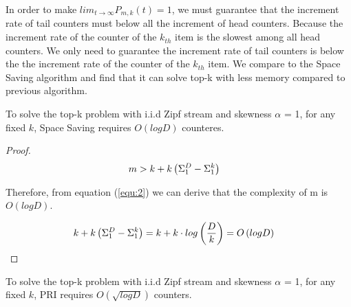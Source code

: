 {%
In order to make $lim_{t\to\infty} P_{m, k}(t) = 1$, we must guarantee that the increment rate of tail counters must below all the increment of head counters. Because the increment rate of the counter of the $k_{th}$ item is the slowest among all head counters. We only need to guarantee the increment rate of tail counters is below the the increment rate of the counter of the $k_{th}$ item.
We compare to the Space Saving algorithm and find that it can solve top-k with less memory compared to previous algorithm. 


\begin{theorem}
	To solve the top-k problem with i.i.d Zipf stream and skewness $\alpha$ = 1, for any fixed $k$, Space Saving requires $O(logD)$ counteres.
\end{theorem}

\begin{proof}
\begin{equation}
\begin{aligned}
\centering  
m &> k + k\left(\Sigma_1^D-\Sigma_1^k\right)
\end{aligned}
\end{equation}

Therefore, from equation (\ref{equ:2}) we can derive that the complexity of m is $O(logD)$.

\begin{equation}
\begin{aligned}
\centering
\label{equ:4}
k + k\left(\Sigma_1^D-\Sigma_1^k\right) &= k + k \cdot log\left(\frac{D}{k}\right) = O\left(logD\right)
\end{aligned}
\end{equation}
\end{proof}

\begin{theorem}
	To solve the top-k problem with i.i.d Zipf stream and skewness $\alpha$ = 1, for any fixed $k$, PRI requires $O(\sqrt{logD})$ counters.
\end{theorem}

}
